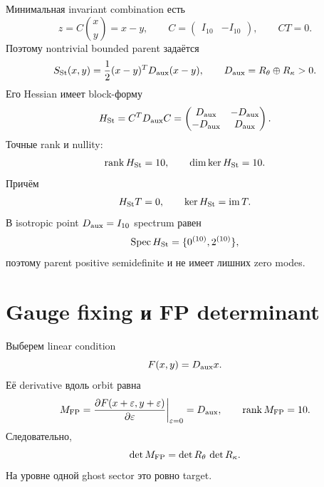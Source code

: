 Минимальная invariant combination есть
\begin{equation}
 z=C\binom{x}{y}=x-y,
 \qquad
 C=\begin{pmatrix}I_{10}&-I_{10}\end{pmatrix},
 \qquad CT=0.
 \label{eq:v9-kms-stueckelberg-invariant}
\end{equation}
Поэтому nontrivial bounded parent задаётся
\begin{equation}
 S_{\rm St}(x,y)
 =\frac12(x-y)^TD_{\rm aux}(x-y),
 \qquad D_{\rm aux}=R_\theta\oplus R_\kappa>0.
 \label{eq:v9-kms-stueckelberg-parent}
\end{equation}
Его Hessian имеет block-форму
\begin{equation}
 H_{\rm St}=C^TD_{\rm aux}C
 =\begin{pmatrix}
 D_{\rm aux}&-D_{\rm aux}\\
 -D_{\rm aux}&D_{\rm aux}
 \end{pmatrix}.
 \label{eq:v9-kms-stueckelberg-hessian}
\end{equation}
Точные rank и nullity:
\begin{equation}
 \operatorname{rank} H_{\rm St}=10,
 \qquad
 \dim\ker H_{\rm St}=10.
 \label{eq:v9-kms-stueckelberg-rank-nullity}
\end{equation}
Причём
\begin{equation}
 H_{\rm St}T=0,
 \qquad
 \ker H_{\rm St}=\operatorname{im}T.
 \label{eq:v9-kms-stueckelberg-kernel-orbit}
\end{equation}
В isotropic point $D_{\rm aux}=I_{10}$ spectrum равен
\begin{equation}
 \operatorname{Spec} H_{\rm St}=\{0^{(10)},2^{(10)}\},
 \label{eq:v9-kms-stueckelberg-spectrum}
\end{equation}
поэтому parent positive semidefinite и не имеет лишних zero modes.

\section{Gauge fixing и FP determinant}

Выберем linear condition
\begin{equation}
 F(x,y)=D_{\rm aux}x.
 \label{eq:v9-kms-stueckelberg-condition}
\end{equation}
Её derivative вдоль orbit равна
\begin{equation}
 M_{\rm FP}
 =\frac{\partial F(x+\varepsilon,y+\varepsilon)}
 {\partial\varepsilon}\bigg|_{\varepsilon=0}
 =D_{\rm aux},
 \qquad \operatorname{rank} M_{\rm FP}=10.
 \label{eq:v9-kms-stueckelberg-fp}
\end{equation}
Следовательно,
\begin{equation}
 \det M_{\rm FP}
 =\det R_\theta\,\det R_\kappa.
 \label{eq:v9-kms-stueckelberg-fp-determinant}
\end{equation}
На уровне одной ghost sector это ровно target.

